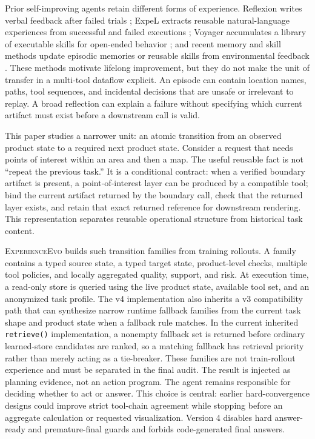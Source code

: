 \documentclass[10pt]{article}
\newcommand{\method}{\textsc{ExperienceEvo}}
\begin{document}
Prior self-improving agents retain different forms of experience. Reflexion writes verbal feedback after failed trials \cite{reflexion}; ExpeL extracts reusable natural-language experiences from successful and failed executions \cite{expel}; Voyager accumulates a library of executable skills for open-ended behavior \cite{voyager}; and recent memory and skill methods update episodic memories or reusable skills from environmental feedback \cite{memrl,autoskill,skillrl,reskill}. These methods motivate lifelong improvement, but they do not make the unit of transfer in a multi-tool dataflow explicit. An episode can contain location names, paths, tool sequences, and incidental decisions that are unsafe or irrelevant to replay. A broad reflection can explain a failure without specifying which current artifact must exist before a downstream call is valid.

This paper studies a narrower unit: an atomic transition from an observed product state to a required next product state. Consider a request that needs points of interest within an area and then a map. The useful reusable fact is not ``repeat the previous task.'' It is a conditional contract: when a verified boundary artifact is present, a point-of-interest layer can be produced by a compatible tool; bind the current artifact returned by the boundary call, check that the returned layer exists, and retain that exact returned reference for downstream rendering. This representation separates reusable operational structure from historical task content.

\method{} builds such transition families from training rollouts. A family contains a typed source state, a typed target state, product-level checks, multiple tool policies, and locally aggregated quality, support, and risk. At execution time, a read-only store is queried using the live product state, available tool set, and an anonymized task profile. The v4 implementation also inherits a v3 compatibility path that can synthesize narrow runtime fallback families from the current task shape and product state when a fallback rule matches. In the current inherited \texttt{retrieve()} implementation, a nonempty fallback set is returned before ordinary learned-store candidates are ranked, so a matching fallback has retrieval priority rather than merely acting as a tie-breaker. These families are not train-rollout experience and must be separated in the final audit. The result is injected as planning evidence, not an action program. The agent remains responsible for deciding whether to act or answer. This choice is central: earlier hard-convergence designs could improve strict tool-chain agreement while stopping before an aggregate calculation or requested visualization. Version 4 disables hard answer-ready and premature-final guards and forbids code-generated final answers.
\end{document}

